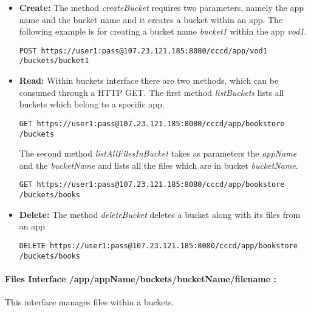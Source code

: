 \begin{itemize}
\item \textbf{Create:} The method \textit{createBucket} requires two parameters, namely the app name and the bucket name and it creates a bucket within an app. The following example is for creating a bucket name \textit{bucket1} within the app \textit{vod1}.

\begin{code}
\begin{verbatim}
POST https://user1:pass@107.23.121.185:8080/cccd/app/vod1
/buckets/bucket1
\end{verbatim}
\end{code}


\item \textbf{Read:} Within buckets interface there are two methods, which can be consumed through a HTTP GET. The first method \textit{listBuckets} lists all buckets which belong to a specific app. 

\begin{code}
\begin{verbatim}
GET https://user1:pass@107.23.121.185:8080/cccd/app/bookstore
/buckets
\end{verbatim}
\end{code}

The second method \textit{listAllFilesInBucket} takes as parameters the \textit{appName} and the \textit{bucketName} and lists all the files which are in bucket \textit{bucketName}.

\begin{code}
\begin{verbatim}
GET https://user1:pass@107.23.121.185:8080/cccd/app/bookstore
/buckets/books
\end{verbatim}
\end{code}


\item \textbf{Delete:} The method \textit{deleteBucket} deletes a bucket along with its files from an app 

\begin{code}
\begin{verbatim}
DELETE https://user1:pass@107.23.121.185:8080/cccd/app/bookstore
/buckets/books
\end{verbatim}
\end{code}

\end{itemize}

\paragraph{Files Interface /app/{appName}/buckets/{bucketName}/{filename} :}  This interface manages files within a buckets.

